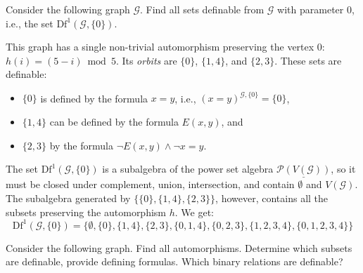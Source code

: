 \begin{example}
    Consider the following graph $\mathcal{G}$. Find all sets definable from $\mathcal{G}$ with parameter $0$, i.e., the set $\mathrm{Df}^1(\mathcal{G}, \{0\})$. 
    \begin{center}
        \end{center}
    This graph has a single non-trivial automorphism preserving the vertex $0$: $h(i) = (5 - i) \bmod 5$. Its \emph{orbits} are $\{0\}$, $\{1, 4\}$, and $\{2, 3\}$. These sets are definable:
    \begin{itemize}
        \item $\{0\}$ is defined by the formula $x = y$, i.e., $(x = y)^{\mathcal{G}, \{0\}} = \{0\}$,
        \item $\{1, 4\}$ can be defined by the formula $E(x, y)$, and
        \item $\{2, 3\}$ by the formula $\neg E(x, y) \land \neg x = y$.
    \end{itemize}
    The set $\mathrm{Df}^1(\mathcal{G}, \{0\})$ is a subalgebra of the power set algebra $\underline{\mathcal{P}(V(\mathcal{G}))}$, so it must be closed under complement, union, intersection, and contain $\emptyset$ and $V(\mathcal{G})$. The subalgebra generated by $\{\{0\}, \{1, 4\}, \{2, 3\}\}$, however, contains all the subsets preserving the automorphism $h$. We get:
    $$
    \mathrm{Df}^1(\mathcal{G}, \{0\}) = \{\emptyset, \{0\}, \{1, 4\}, \{2, 3\}, \{0, 1, 4\}, \{0, 2, 3\}, \{1, 2, 3, 4\}, \{0, 1, 2, 3, 4\}\}
    $$
\end{example}

\begin{exercise}
    Consider the following graph. Find all automorphisms. Determine which subsets are definable, provide defining formulas. Which binary relations are definable?
    \begin{center}
    \end{center}
\end{exercise}


